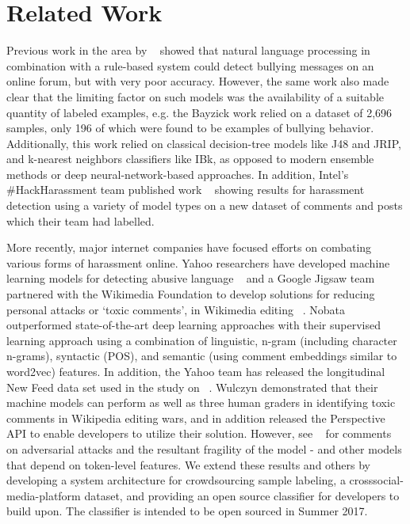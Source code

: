 \documentclass[11pt,a4paper]{article}
\begin{document}
\section{Related Work}

Previous work in the area by ~\cite{Bayzick:2011} showed that natural language
processing in combination with a rule-based
system could detect bullying messages on an
online forum, but with very poor accuracy. However,
the same work also made clear that the limiting
factor on such models was the availability of a
suitable quantity of labeled examples, e.g. the
Bayzick work relied on a dataset of 2,696 samples,
only 196 of which were found to be examples of
bullying behavior. Additionally, this work relied
on classical decision-tree models like J48 and
JRIP, and k-nearest neighbors classifiers like IBk,
as opposed to modern ensemble methods or deep
neural-network-based approaches. In addition, Intel's
\#HackHarassment team published work ~\cite{Bastidas:2016} showing results for harassment
detection using a variety of model types on a new
dataset of comments and posts which their team
had labelled.

More recently, major internet companies have
focused efforts on combating various forms of harassment
online. Yahoo researchers have developed
machine learning models for detecting abusive
language ~\cite{Nobata:2016a} and a Google Jigsaw team partnered
with the Wikimedia Foundation to develop
solutions for reducing personal attacks or ‘toxic
comments’, in Wikimedia editing ~\cite{Wulczyn:2017}. Nobata outperformed
state-of-the-art deep learning approaches
with their supervised learning approach
using a combination of linguistic, n-gram (including
character n-grams), syntactic (POS), and semantic
(using comment embeddings similar to
word2vec) features. In addition, the Yahoo team
has released the longitudinal New Feed data set
used in the study on ~\cite{Webscope:2017}. Wulczyn
demonstrated that their machine models can perform
as well as three human graders in identifying
toxic comments in Wikipedia editing wars, and in
addition released the Perspective API to enable developers
to utilize their solution. However, see
~\cite{Hosseini:2017}
for comments on adversarial attacks and the resultant
fragility of the model - and other models that
depend on token-level features. We extend these
results and others by developing a system architecture
for crowdsourcing sample labeling, a crosssocial-media-platform
dataset, and providing an
open source classifier for developers to build upon.
The classifier is intended to be open sourced in
Summer 2017.
\end{document}
